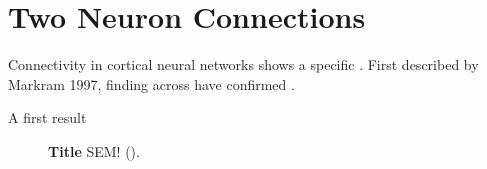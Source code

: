 
\section{Two Neuron Connections}

Connectivity in cortical neural networks shows a specific . First
described by Markram 1997, finding across have confirmed . 

A first result


\begin{figure}[htp]
  \centering
  \vspace{0.2cm}
  \caption{\textbf{Title} SEM!  ().} %
  \label{fig:two_neuron_probs}
\end{figure}  



